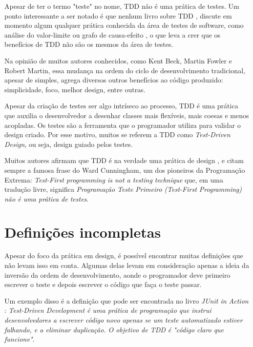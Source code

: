 Apesar de ter o termo "teste" no nome, TDD não é uma prática de testes.
Um ponto interessante a ser notado é que nenhum livro sobre TDD \cite{GOOS}
\cite{TDDByExample} \cite{astels-tdd}, discute em momento algum qualquer
prática conhecida da área de testes de software, como análise do valor-limite ou
grafo de causa-efeito \cite{art-of-sw-testing}, o que leva a crer que os
benefícios de TDD não são os mesmos da área de testes.

Na opinião de muitos autores conhecidos, como Kent Beck, Martin Fowler e Robert
Martin, essa mudança na ordem do ciclo de desenvolvimento tradicional, apesar de
simples, agrega diversos outros benefícios ao código produzido: simplicidade,
foco, melhor design, entre outras.

Apesar da criação de testes ser algo intríseco ao processo, TDD é uma prática
que auxilia o desenvolvedor a desenhar classes mais flexíveis, mais coesas e
menos acopladas. Os testes são a ferramenta que o programador utiliza para
validar o design criado. Por esse motivo, muitos se referem a TDD como
\textit{Test-Driven Design}, ou seja, design guiado pelos testes.

Muitos autores afirmam que TDD é na verdade uma prática de design
\cite{tdd-taxonomy} \cite{aim-fire}, e citam sempre a famosa frase do Ward
Cunningham, um dos pioneiros da Programação Extrema: \textit{Test-First
programming is not a testing technique} que, em uma tradução livre, significa
\textit{Programação Teste Primeiro (Test-First Programming) não é uma prática
de testes}.

\section{Definições incompletas}

Apesar do foco da prática em design, é possível encontrar muitas definições que
não levam isso em conta. Algumas delas levam em consideração apenas a ideia da
inversão da ordem de desenvolvimento, aonde o programador deve primeiro escrever
o teste e depois escrever o código que faça o teste passar.

Um exemplo disso é a definição que pode ser encontrada no livro \textit{JUnit
in Action} \cite{junit-in-action}: \textit{Test-Driven Development é uma
prática de programação que instrui desenvolvedores a escrever código novo
apenas se um teste automatizado estiver falhando, e a eliminar duplicação. O
objetivo de TDD é "código claro que funcione"}.

